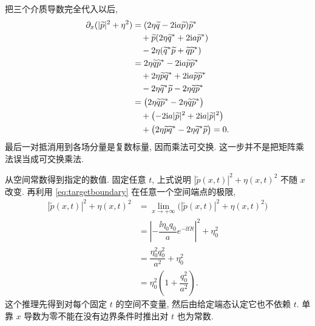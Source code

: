 把三个介质导数完全代入以后,
\begin{align*}
\partial_x(|\widetilde p|^2+\eta^2)
&=(2\eta\widetilde q-2\mathrm{i} a\widetilde p)
{\widetilde p}^{*}\\
&\quad+\widetilde p
(2\eta{\widetilde q}^{*}+2\mathrm{i} a{\widetilde p}^{*})\\
&\quad-2\eta
({\widetilde q}^{*}\widetilde p+\widetilde q{\widetilde p}^{*})\\
&=2\eta\widetilde q{\widetilde p}^{*}
-2\mathrm{i} a\widetilde p{\widetilde p}^{*}\\
&\quad+2\eta\widetilde p{\widetilde q}^{*}
+2\mathrm{i} a\widetilde p{\widetilde p}^{*}\\
&\quad-2\eta{\widetilde q}^{*}\widetilde p
-2\eta\widetilde q{\widetilde p}^{*}\\
&=\bigl(2\eta\widetilde q{\widetilde p}^{*}
-2\eta\widetilde q{\widetilde p}^{*}\bigr)\\
&\quad+\bigl(-2\mathrm{i} a|\widetilde p|^2
+2\mathrm{i} a|\widetilde p|^2\bigr)\\
&\quad+\bigl(2\eta\widetilde p{\widetilde q}^{*}
-2\eta{\widetilde q}^{*}\widetilde p\bigr)=0.
\end{align*}
最后一对抵消用到各场分量是复数标量, 因而乘法可交换. 这一步并不是把矩阵乘法误当成可交换乘法.
\par\smallskip\noindent 从空间常数得到指定的数值.\quad
固定任意 $t$, 上式说明 $|\widetilde p(x,t)|^2+\eta(x,t)^2$ 不随 $x$ 改变. 再利用 \eqref{eq:targetboundary} 在任意一个空间端点的极限,
\begin{align*}
|\widetilde p(x,t)|^2+\eta(x,t)^2
&=\lim\limits_{x\to+\infty}
\bigl(|\widetilde p(x,t)|^2+\eta(x,t)^2\bigr)\\
&=\left|-\dfrac{\ii\eta_0q_0}{a}e^{-\ii\Omega t}\right|^2
+\eta_0^2\\
&=\dfrac{\eta_0^2q_0^2}{a^2}+\eta_0^2\\
&=\eta_0^2\left(1+\dfrac{q_0^2}{a^2}\right).
\end{align*}
这个推理先得到对每个固定 $t$ 的空间不变量, 然后由给定端态认定它也不依赖 $t$. 单靠 $x$ 导数为零不能在没有边界条件时推出对 $t$ 也为常数.




